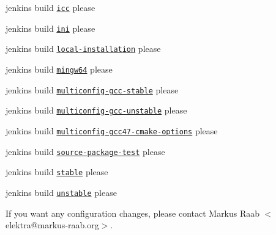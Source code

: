 \begin{DoxyItemize}
\item jenkins build \href{http://build.libelektra.org:8080/job/elektra-icc/}{\tt icc} please
\item jenkins build \href{http://build.libelektra.org:8080/job/elektra-ini-mergerequests/}{\tt ini} please
\item jenkins build \href{http://build.libelektra.org:8080/job/elektra-local-installation/}{\tt local-\/installation} please
\item jenkins build \href{http://build.libelektra.org:8080/job/elektra-gcc-configure-mingw-w64/}{\tt mingw64} please
\item jenkins build \href{http://build.libelektra.org:8080/job/elektra-multiconfig-gcc-stable/}{\tt multiconfig-\/gcc-\/stable} please
\item jenkins build \href{http://build.libelektra.org:8080/job/elektra-multiconfig-gcc-unstable/}{\tt multiconfig-\/gcc-\/unstable} please
\item jenkins build \href{http://build.libelektra.org:8080/job/elektra-multiconfig-gcc47-cmake-options/}{\tt multiconfig-\/gcc47-\/cmake-\/options} please
\item jenkins build \href{http://build.libelektra.org:8080/job/elektra-source-package-test/}{\tt source-\/package-\/test} please
\item jenkins build \href{http://build.libelektra.org:8080/job/elektra-mergerequests-stable/}{\tt stable} please
\item jenkins build \href{http://build.libelektra.org:8080/job/elektra-mergerequests-unstable/}{\tt unstable} please
\end{DoxyItemize}

If you want any configuration changes, please contact {\ttfamily Markus Raab $<$elektra@markus-\/raab.\+org$>$}. 